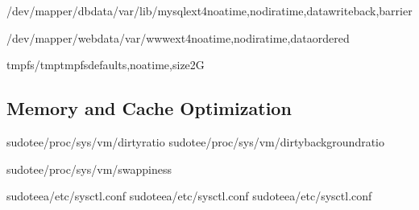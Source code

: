 \documentclass[letterpaper,10pt,english]{sphinxmanual}
\begin{document}
\begin{sphinxVerbatim}[commandchars=\\\{\}]

/dev/mapper/db\PYGZhy{}data/var/lib/mysqlext4noatime,nodiratime,datawriteback,barrier

/dev/mapper/web\PYGZhy{}data/var/wwwext4noatime,nodiratime,dataordered

tmpfs/tmptmpfsdefaults,noatime,size2G
\end{sphinxVerbatim}


\subsection{Memory and Cache Optimization}
\label{\detokenize{best-practices:memory-and-cache-optimization}}
\sphinxAtStartPar
{}

\begin{sphinxVerbatim}[commandchars=\\\{\}]
sudotee/proc/sys/vm/dirty\PYGZus{}ratio
sudotee/proc/sys/vm/dirty\PYGZus{}background\PYGZus{}ratio

sudotee/proc/sys/vm/swappiness

sudotee\PYGZhy{}a/etc/sysctl.conf
sudotee\PYGZhy{}a/etc/sysctl.conf
sudotee\PYGZhy{}a/etc/sysctl.conf
\end{sphinxVerbatim}
\end{document}
